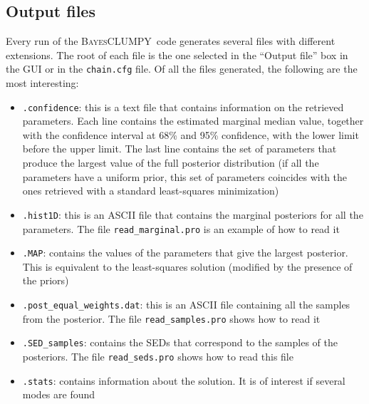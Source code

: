 \documentclass[12pt]{article}
\def\B{\textsc{BayesCLUMPY}}
\begin{document}
\subsection{Output files}
\label{sec:output}

Every run of the \B\ code generates several files with different extensions. The root
of each file is the one selected in the ``Output file'' box in the GUI or in the 
\texttt{chain.cfg} file. Of all the files generated, the following are the most interesting:
\begin{itemize}
 \item \texttt{.confidence}: this is a text file that contains information on the retrieved parameters.
 Each line contains the estimated marginal median value, together with the confidence interval at 68\%
 and 95\% confidence, with the lower limit before the upper limit. The last line contains the set of
 parameters that produce the largest value of the full posterior distribution (if all the parameters
 have a uniform prior, this set of parameters coincides with the ones retrieved with a standard 
 least-squares minimization)
 \item \texttt{.hist1D}: this is an ASCII file that contains the marginal posteriors for all the parameters. The 
 file \texttt{read\_marginal.pro} is an example of how to read it
 \item \texttt{.MAP}: contains the values of the parameters that give the largest posterior. This is equivalent to
 the least-squares solution (modified by the presence of the priors)
 \item \texttt{.post\_equal\_weights.dat}: this is an ASCII file containing all the samples from the posterior. The file
 \texttt{read\_samples.pro} shows how to read it
 \item \texttt{.SED\_samples}: contains the SEDs that correspond to the samples of the posteriors. The file \texttt{read\_seds.pro}
 shows how to read this file
 \item \texttt{.stats}: contains information about the solution. It is of interest if several modes are found
\end{itemize}


\end{document}
